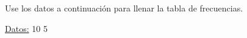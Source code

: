 \documentclass{cdplf-prueba}
\begin{document}
\subsection{}

Use los datos a continuación para llenar la tabla de frecuencias.

\underline{Datos:} \hspace{4pt} 10 \hspace{4pt}\textbullet\hspace{4pt} 5 \hspace{4pt}\textbulle
\end{document}
